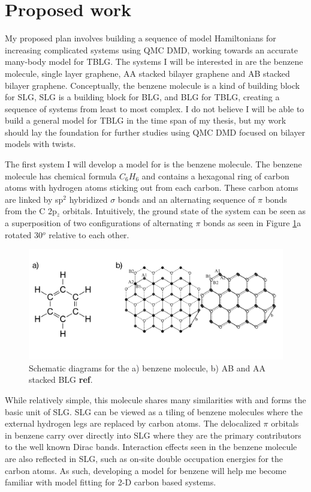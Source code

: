 \documentclass[12pt]{article}
\begin{document}
\section{Proposed work}
My proposed plan involves building a sequence of model Hamiltonians for increasing complicated systems using QMC DMD, working towards an accurate many-body model for TBLG.
The systems I will be interested in are the benzene molecule, single layer graphene, AA stacked bilayer graphene and AB stacked bilayer graphene.
Conceptually, the benzene molecule is a kind of building block for SLG, SLG is a building block for BLG, and BLG for TBLG, creating a sequence of systems from least to most complex.
I do not believe I will be able to build a general model for TBLG in the time span of my thesis, but my work should lay the foundation for further studies using QMC DMD focused on bilayer models with twists.

The first system I will develop a model for is the benzene molecule.
The benzene molecule has chemical formula $C_6 H_6$ and contains a hexagonal ring of carbon atoms with hydrogen atoms sticking out from each carbon.
These carbon atoms are linked by sp$^2$ hybridized $\sigma$ bonds and an alternating sequence of $\pi$ bonds from the C 2p$_z$ orbitals.
Intuitively, the ground state of the system can be seen as a superposition of two configurations of alternating $\pi$ bonds as seen in Figure \ref{fig:proposed}a rotated 30$^o$ relative to each other.

\begin{figure}
\centering
\includegraphics[width=1.0\linewidth]{./figs/proposed.pdf}
\caption{Schematic diagrams for the a) benzene molecule, b) AB and AA stacked BLG \textbf{ref}.}
\label{fig:proposed}
\end{figure}

While relatively simple, this molecule shares many similarities with and forms the basic unit of SLG.
SLG can be viewed as a tiling of benzene molecules where the external hydrogen legs are replaced by carbon atoms.
The delocalized $\pi$ orbitals in benzene carry over directly into SLG where they are the primary contributors to the well known Dirac bands.
Interaction effects seen in the benzene molecule are also reflected in SLG, such as on-site double occupation energies for the carbon atoms.
As such, developing a model for benzene will help me become familiar with model fitting for 2-D carbon based systems.
\end{document}
